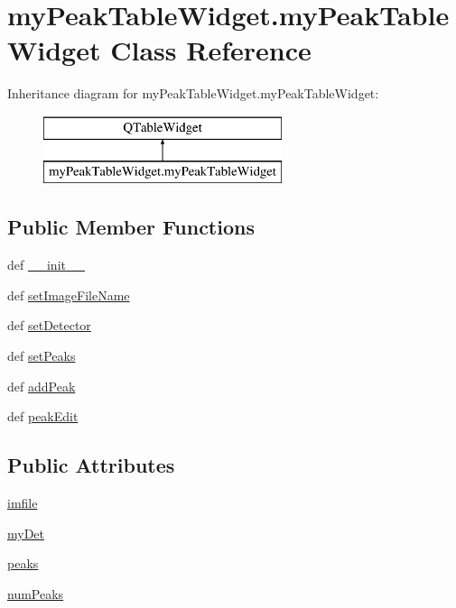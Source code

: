 \hypertarget{classmy_peak_table_widget_1_1my_peak_table_widget}{\section{my\-Peak\-Table\-Widget.\-my\-Peak\-Table\-Widget Class Reference}
\label{classmy_peak_table_widget_1_1my_peak_table_widget}
}
Inheritance diagram for my\-Peak\-Table\-Widget.\-my\-Peak\-Table\-Widget\-:\begin{figure}[H]
\begin{center}
\leavevmode
\includegraphics[height=2.000000cm]{classmy_peak_table_widget_1_1my_peak_table_widget}
\end{center}
\end{figure}
\subsection*{Public Member Functions}
\begin{DoxyCompactItemize}
\item 
def \hyperlink{classmy_peak_table_widget_1_1my_peak_table_widget_a112e9c9fe94f89bee7313906355d6c8f}{\-\_\-\-\_\-init\-\_\-\-\_\-}
\item 
def \hyperlink{classmy_peak_table_widget_1_1my_peak_table_widget_abc9980e6816ae93b1302da488b1eb83b}{set\-Image\-File\-Name}
\item 
def \hyperlink{classmy_peak_table_widget_1_1my_peak_table_widget_a30d9b900b3a8eb5fac45aacdd1355b4c}{set\-Detector}
\item 
def \hyperlink{classmy_peak_table_widget_1_1my_peak_table_widget_a3c7bc1e38db2eb6e0458a438a753f6c3}{set\-Peaks}
\item 
def \hyperlink{classmy_peak_table_widget_1_1my_peak_table_widget_aa4aed89efa31348e87d73f711d996daf}{add\-Peak}
\item 
def \hyperlink{classmy_peak_table_widget_1_1my_peak_table_widget_ac06c362f6d4a47181fbcc0fe2e78a2cb}{peak\-Edit}
\end{DoxyCompactItemize}
\subsection*{Public Attributes}
\begin{DoxyCompactItemize}
\item 
\hyperlink{classmy_peak_table_widget_1_1my_peak_table_widget_ac482a5f93ba7061a3a6e8c6d46e2e26b}{imfile}
\item 
\hyperlink{classmy_peak_table_widget_1_1my_peak_table_widget_a9c8259e29d4d739d45452eaec8bebff0}{my\-Det}
\item 
\hyperlink{classmy_peak_table_widget_1_1my_peak_table_widget_afa4b43bf4a5bf3308bf8a7d4c146712b}{peaks}
\item 
\hyperlink{classmy_peak_table_widget_1_1my_peak_table_widget_ae4934e86392397c16937ababde3ac38e}{num\-Peaks}
\end{DoxyCompactItemize}
